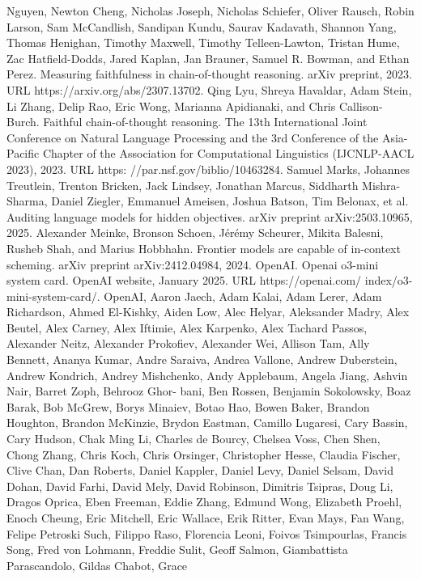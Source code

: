 Nguyen, Newton Cheng, Nicholas Joseph, Nicholas Schiefer, Oliver Rausch, Robin Larson, Sam
McCandlish, Sandipan Kundu, Saurav Kadavath, Shannon Yang, Thomas Henighan, Timothy
Maxwell, Timothy Telleen-Lawton, Tristan Hume, Zac Hatfield-Dodds, Jared Kaplan, Jan Brauner,
Samuel R. Bowman, and Ethan Perez. Measuring faithfulness in chain-of-thought reasoning. arXiv
preprint, 2023. URL https://arxiv.org/abs/2307.13702.
Qing Lyu, Shreya Havaldar, Adam Stein, Li Zhang, Delip Rao, Eric Wong, Marianna Apidianaki,
and Chris Callison-Burch. Faithful chain-of-thought reasoning. The 13th International Joint
Conference on Natural Language Processing and the 3rd Conference of the Asia-Pacific Chapter
of the Association for Computational Linguistics (IJCNLP-AACL 2023), 2023. URL https:
//par.nsf.gov/biblio/10463284.
Samuel Marks, Johannes Treutlein, Trenton Bricken, Jack Lindsey, Jonathan Marcus, Siddharth
Mishra-Sharma, Daniel Ziegler, Emmanuel Ameisen, Joshua Batson, Tim Belonax, et al. Auditing
language models for hidden objectives. arXiv preprint arXiv:2503.10965, 2025.
Alexander Meinke, Bronson Schoen, Jérémy Scheurer, Mikita Balesni, Rusheb Shah, and Marius
Hobbhahn. Frontier models are capable of in-context scheming. arXiv preprint arXiv:2412.04984,
2024.
OpenAI. Openai o3-mini system card. OpenAI website, January 2025. URL https://openai.com/
index/o3-mini-system-card/.
OpenAI, Aaron Jaech, Adam Kalai, Adam Lerer, Adam Richardson, Ahmed El-Kishky, Aiden
Low, Alec Helyar, Aleksander Madry, Alex Beutel, Alex Carney, Alex Iftimie, Alex Karpenko,
Alex Tachard Passos, Alexander Neitz, Alexander Prokofiev, Alexander Wei, Allison Tam, Ally
Bennett, Ananya Kumar, Andre Saraiva, Andrea Vallone, Andrew Duberstein, Andrew Kondrich,
Andrey Mishchenko, Andy Applebaum, Angela Jiang, Ashvin Nair, Barret Zoph, Behrooz Ghor-
bani, Ben Rossen, Benjamin Sokolowsky, Boaz Barak, Bob McGrew, Borys Minaiev, Botao
Hao, Bowen Baker, Brandon Houghton, Brandon McKinzie, Brydon Eastman, Camillo Lugaresi,
Cary Bassin, Cary Hudson, Chak Ming Li, Charles de Bourcy, Chelsea Voss, Chen Shen, Chong
Zhang, Chris Koch, Chris Orsinger, Christopher Hesse, Claudia Fischer, Clive Chan, Dan Roberts,
Daniel Kappler, Daniel Levy, Daniel Selsam, David Dohan, David Farhi, David Mely, David
Robinson, Dimitris Tsipras, Doug Li, Dragos Oprica, Eben Freeman, Eddie Zhang, Edmund Wong,
Elizabeth Proehl, Enoch Cheung, Eric Mitchell, Eric Wallace, Erik Ritter, Evan Mays, Fan Wang,
Felipe Petroski Such, Filippo Raso, Florencia Leoni, Foivos Tsimpourlas, Francis Song, Fred
von Lohmann, Freddie Sulit, Geoff Salmon, Giambattista Parascandolo, Gildas Chabot, Grace
